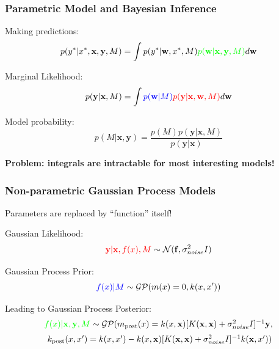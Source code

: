 \documentclass[10pt]{beamer}
\newcommand{\bx}{\mathbf{x}}
\newcommand{\by}{\mathbf{y}}
\newcommand{\bw}{\mathbf{w}}
\newcommand{\boldf}{\mathbf{f}}
\newcommand{\gp}{\mathcal{GP}}
\newcommand{\gaussN}{\mathcal{N}}
\begin{document}
  \begin{frame}
    \frametitle{Parametric Model and Bayesian Inference}

    Making predictions:
      \begin{equation*}
        p(y^*|x^*,\bx,\by,M) = \int p(y^*|\bw,x^*,M) \textcolor{green}{p(\bw|\bx,\by,M)} d\bw
      \end{equation*}

    Marginal Likelihood:
      \begin{equation*}
        p(\by|\bx,M) = \int \textcolor{blue}{p(\bw|M)} \textcolor{red}{p(\by|\bx, \bw, M)} d\bw
      \end{equation*}

    Model probability:
      \begin{equation*}
        p(M|\bx,\by) = \frac{p(M)p(\by|\bx,M)}{p(\by|\bx)}
      \end{equation*}

    \begin{center}
      \textbf{Problem: integrals are intractable for most interesting models!}
    \end{center}
  \end{frame}

  \begin{frame}
    \frametitle{Non-parametric Gaussian Process Models}
    Parameters are replaced by ``function'' itself!

    Gaussian Likelihood:
      \begin{equation*}
        \textcolor{red}{\by|\bx,f(x),M} \sim \gaussN(\boldf, \sigma^2_{noise}I)
      \end{equation*}

    Gaussian Process Prior:
      \begin{equation*}
        \textcolor{blue}{f(x)|M} \sim \gp(m(x) = 0, k(x,x'))
      \end{equation*}

    Leading to Gaussian Process Posterior:
      \begin{equation*}
        \begin{array}{c}
          \textcolor{green}{f(x)|\bx,\by,M} \sim \gp ( m_{\text{post}}(x) = k(x,\bx)[K(\bx,\bx) + \sigma^2_{noise}I]^{-1} \by, \\[0.2cm]
          \; k_{\text{post}}(x,x') =  k(x,x') - k(x,\bx)[K(\bx,\bx) + \sigma^2_{noise}I]^{-1} k(\bx,x') )
        \end{array}
      \end{equation*}
    \end{frame}
\end{document}

